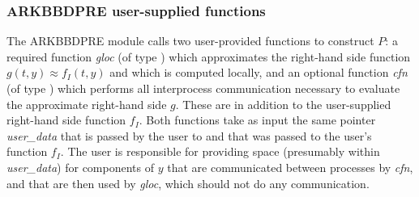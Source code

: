 \documentclass[letterpaper,10pt,english]{sphinxmanual}
\begin{document}
\subsubsection{ARKBBDPRE user-supplied functions}
\label{c_interface/Preconditioners:arkbbdpre-user-supplied-functions}
The ARKBBDPRE module calls two user-provided functions to construct
$P$: a required function \emph{gloc} (of type {\hyperref[c_interface/Preconditioners:ARKLocalFn]{}})
which approximates the right-hand side function $g(t,y) \approx
f_I(t,y)$ and which is computed locally, and an optional function
\emph{cfn} (of type {\hyperref[c_interface/Preconditioners:ARKCommFn]{}}) which performs all interprocess
communication necessary to evaluate the approximate right-hand side
$g$. These are in addition to the user-supplied right-hand side
function $f_I$. Both functions take as input the same pointer
\emph{user\_data} that is passed by the user to
{\hyperref[c_interface/User_callable:ARKodeSetUserData]{}} and that was passed to the user's
function $f_I$. The user is responsible for providing space
(presumably within \emph{user\_data}) for components of $y$ that are
communicated between processes by \emph{cfn}, and that are then used by
\emph{gloc}, which should not do any communication.
\end{document}
